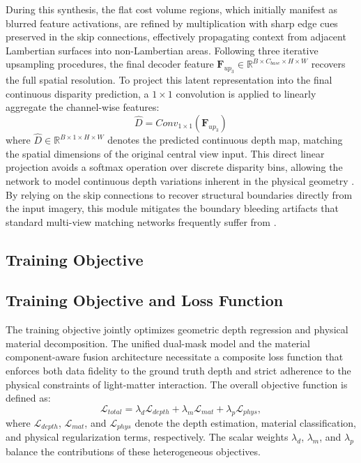 \documentclass[lettersize,journal]{IEEEtran}
\begin{document}
During this synthesis, the flat cost volume regions, which initially manifest as blurred feature activations, are refined by multiplication with sharp edge cues preserved in the skip connections, effectively propagating context from adjacent Lambertian surfaces into non-Lambertian areas. Following three iterative upsampling procedures, the final decoder feature $\mathbf{F}_{up_3} \in \mathbb{R}^{B \times C_{base} \times H \times W}$ recovers the full spatial resolution. To project this latent representation into the final continuous disparity prediction, a $1 \times 1$ convolution is applied to linearly aggregate the channel-wise features:
\begin{equation}
\hat{D} = Conv_{1 \times 1} (\mathbf{F}_{up_3})
\end{equation}
where $\hat{D} \in \mathbb{R}^{B \times 1 \times H \times W}$ denotes the predicted continuous depth map, matching the spatial dimensions of the original central view input. This direct linear projection avoids a softmax operation over discrete disparity bins, allowing the network to model continuous depth variations inherent in the physical geometry \cite{eigen2014}. By relying on the skip connections to recover structural boundaries directly from the input imagery, this module mitigates the boundary bleeding artifacts that standard multi-view matching networks frequently suffer from \cite{heber2018}.

\subsection{Training Objective}

\subsection{Training Objective and Loss Function}
\label{subsec:loss_function}

The training objective jointly optimizes geometric depth regression and physical material decomposition. The unified dual-mask model and the material component-aware fusion architecture necessitate a composite loss function that enforces both data fidelity to the ground truth depth and strict adherence to the physical constraints of light-matter interaction. The overall objective function is defined as:
\begin{equation}
\label{eq:total_loss}
\mathcal{L}_{total} = \lambda_{d} \mathcal{L}_{depth} + \lambda_{m} \mathcal{L}_{mat} + \lambda_{p} \mathcal{L}_{phys},
\end{equation}
where $\mathcal{L}_{depth}$, $\mathcal{L}_{mat}$, and $\mathcal{L}_{phys}$ denote the depth estimation, material classification, and physical regularization terms, respectively. The scalar weights $\lambda_{d}$, $\lambda_{m}$, and $\lambda_{p}$ balance the contributions of these heterogeneous objectives.
\end{document}
